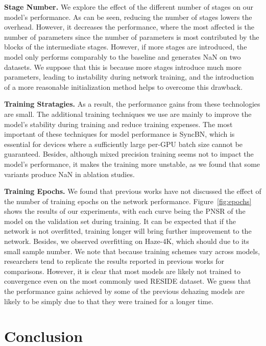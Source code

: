 \documentclass[10pt,twocolumn,letterpaper]{article}
\begin{document}
\noindent\textbf{Stage Number.}
We explore the effect of the different number of stages on our model's performance. 
As can be seen, reducing the number of stages lowers the overhead. 
However, it decreases the performance, where the most affected is the number of parameters since the number of parameters is most contributed by the blocks of the intermediate stages.
However, if more stages are introduced, the model only performs comparably to the baseline and generates NaN on two datasets.
We suppose that this is because more stages introduce much more parameters, leading to instability during network training, and the introduction of a more reasonable initialization method helps to overcome this drawback.

\noindent\textbf{Training Stratagies.}
As a result, the performance gains from these technologies are small.
The additional training techniques we use are mainly to improve the model's stability during training and reduce training expenses.
The most important of these techniques for model performance is SyncBN, which is essential for devices where a sufficiently large per-GPU batch size cannot be guaranteed.
Besides, although mixed precision training seems not to impact the model's performance, it makes the training more unstable, as we found that some variants produce NaN in ablation studies.

\noindent\textbf{Training Epochs.}
We found that previous works have not discussed the effect of the number of training epochs on the network performance. 
Figure~\ref{fig:epochs} shows the results of our experiments, with each curve being the PNSR of the model on the validation set during training.
It can be expected that if the network is not overfitted, training longer will bring further improvement to the network.
Besides, we observed overfitting on Haze-4K, which should due to its small sample number.
We note that because training schemes vary across models, researchers tend to replicate the results reported in previous works for comparisons.
However, it is clear that most models are likely not trained to convergence even on the most commonly used RESIDE dataset.
We guess that the performance gains achieved by some of the previous dehazing models are likely to be simply due to that they were trained for a longer time.
 \vspace{1em}

\section{Conclusion}
\end{document}
